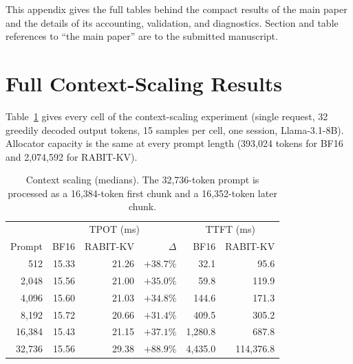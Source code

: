 \documentclass{article}
\begin{document}

{\let\thefootnote\relax{}}

\appendix

This appendix gives the full tables behind the compact results of the main paper and the details of
its accounting, validation, and diagnostics. Section and table references to ``the main paper'' are
to the submitted manuscript.

\section{Full Context-Scaling Results}
\label{app:context}

Table~\ref{tab:app-context} gives every cell of the context-scaling experiment (single request, 32
greedily decoded output tokens, 15 samples per cell, one session, Llama-3.1-8B). Allocator capacity is
the same at every prompt length (393,024 tokens for BF16 and 2,074,592 for RABIT-KV).

\begin{table}[h]
\centering
\small
\setlength{\tabcolsep}{3.5pt}
\begin{tabular}{@{}rrrrrr@{}}
\toprule
 & \multicolumn{3}{c}{TPOT (ms)} & \multicolumn{2}{c}{TTFT (ms)} \\
Prompt & BF16 & RABIT-KV & $\Delta$ & BF16 & RABIT-KV \\
\midrule
512 & 15.33 & 21.26 & $+38.7\%$ & 32.1 & 95.6 \\
2,048 & 15.56 & 21.00 & $+35.0\%$ & 59.8 & 119.9 \\
4,096 & 15.60 & 21.03 & $+34.8\%$ & 144.6 & 171.3 \\
8,192 & 15.72 & 20.66 & $+31.4\%$ & 409.5 & 305.2 \\
16,384 & 15.43 & 21.15 & $+37.1\%$ & 1,280.8 & 687.8 \\
32,736 & 15.56 & 29.38 & $+88.9\%$ & 4,435.0 & 114,376.8 \\
\bottomrule
\end{tabular}
\caption{Context scaling (medians). The 32,736-token prompt is processed as a 16,384-token first chunk
and a 16,352-token later chunk.}
\label{tab:app-context}
\end{table}
\end{document}
